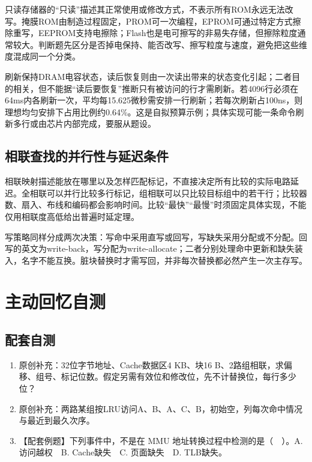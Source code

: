 只读存储器的``只读''描述其正常使用或修改方式，不表示所有ROM永远无法改写。掩膜ROM由制造过程固定，PROM可一次编程，EPROM可通过特定方式擦除重写，EEPROM支持电擦除；Flash也是电可擦写的非易失存储，但擦除粒度通常较大。判断题先区分是否掉电保持、能否改写、擦写粒度与速度，避免把这些维度混成同一个分类。

刷新保持DRAM电容状态，读后恢复则由一次读出带来的状态变化引起；二者目的相关，但不能据``读后要恢复''推断只有被访问的行才需刷新。若4096行必须在64ms内各刷新一次，平均每15.625微秒需安排一行刷新；若每次刷新占100ns，则理想均匀安排下占用比例约0.64\%。这是自拟预算示例；具体实现可能一条命令刷新多行或由芯片内部完成，要服从题设。

\subsection{相联查找的并行性与延迟条件}\label{CO03-assoc}

相联映射描述能放在哪里以及怎样匹配标记，不直接决定所有比较的实际电路延迟。全相联可以并行比较多行标记，组相联可以只比较目标组中的若干行；比较器数、扇入、布线和编码都会影响时间。比较``最快''``最慢''时须固定具体实现，不能仅用相联度高低给出普遍时延定理。

写策略同样分成两次决策：写命中采用直写或回写，写缺失采用分配或不分配。回写的英文为write-back，写分配为write-allocate；二者分别处理命中更新和缺失装入，名字不能互换。脏块替换时才需写回，并非每次替换都必然产生一次主存写。

\section{主动回忆自测}\label{CO03-recall}

\subsection{配套自测}\label{CO03-32}

\begin{enumerate}
\def\labelenumi{\arabic{enumi}.}
\tightlist
\item
  原创补充：32位字节地址、Cache数据区4 KB、块16 B、2路组相联，求偏移、组号、标记位数。假定另需有效位和修改位，先不计替换位，每行多少位？
\item
  原创补充：两路某组按LRU访问A、B、A、C、B，初始空，列每次命中情况与最近到最久次序。
\item
  【配套例题】下列事件中，不是在 MMU 地址转换过程中检测的是（　）。A. 访问越权　B. Cache缺失　C. 页面缺失　D. TLB缺失。
\end{enumerate}

